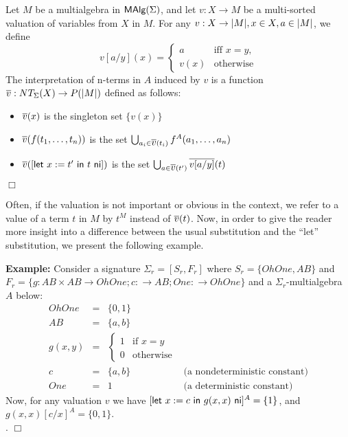 \begin{Definition} Let $M$ be a multialgebra in $\mbox{\rm\sf MAlg}(\Sigma)$, and
let $v: X \rightarrow M$ be a multi-sorted valuation of variables
from $X$ in $M$. For any $v:X\rightarrow |M|, x\in X, a\in |M|$, we define
\[
v[a/y](x) = \left\{
            \begin{array}{ll} 
                   a    & \mbox{iff $x=y$}, \\
                   v(x) & \mbox{otherwise}
            \end{array}
            \right.
\]
The interpretation of n-terms in $A$ induced by $v$ is a function 
$\mbox{$\overline{v}$}: NT_{\Sigma}(X) \rightarrow P(|M|)$ defined as follows:
\begin{itemize} 
\item{$\mbox{$\overline{v}$}(x)$ is the singleton set $\{v(x)\}$}
\item{$\mbox{$\overline{v}$}(f(t_1,\ldots,t_n))$ is the set $\bigcup_{a_i \in
      \mbox{$\overline{v}$}(t_i)} f^{A}(a_1,\ldots,a_n)$}
\item{$\mbox{$\overline{v}$}([{\sf let}\ x := t'\ {\sf in}\ t\ {\sf ni}])$ is the set 
      $\bigcup_{a \in \mbox{$\overline{v}$}(t')} \mbox{$\overline{v[a/y]}$}(t)$}
\end{itemize}
\hfill$\Box$ 
\end{Definition}
%
Often, if the valuation is not important or obvious in the context, we
refer to a value of a term $t$ in $M$ by $t^M$ instead of
$\mbox{$\overline{v}$}(t)$. Now, in order to give the reader more insight into a
difference between the usual substitution and the ``{\sf let}''
substitution, we present the following example.
\medskip

\noindent
{\bf Example:} Consider a signature $ \Sigma_r = [S_r,F_r]$ where $S_r
= \{OhOne, AB\}$ and $F_r = \{g: AB \times AB \rightarrow OhOne; c:
\rightarrow AB; One: \rightarrow OhOne\}$ and a
$\Sigma_r$-multialgebra $A$ below:
\[ 
\begin{array}{lcll} 
       OhOne  & = & \{0,1\} & \\ AB & = & \{a,b\} & \\
       g(x,y) & = & \left\{\begin{array}{ll} 1 & \mbox{if $x = y$} \\ 
                                              0 & \mbox{otherwise} 
                           \end{array} \right. & \\ 
       c      & = & \{a,b\} & \mbox{(a nondeterministic constant)} \\ 
       One    & = & 1 & \mbox{(a deterministic constant)}
\end{array} 
\]
Now, for any valuation $v$ we have $[{\sf let}\ x := c\ {\sf in}\ g(x,x)\ {\sf ni}]^{A} = \{1\}$, and
$g(x,x)[c/x]^{A} = \{0,1\}$. \\. \hfill$\Box$ 

